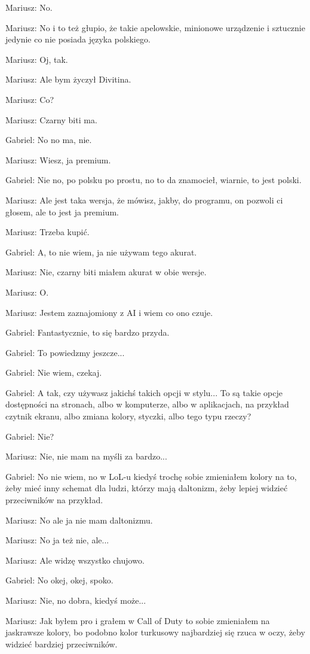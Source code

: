 Mariusz: No.

Mariusz: No i to też głupio, że takie apelowskie, minionowe urządzenie i sztucznie jedynie co nie posiada języka polskiego.

Mariusz: Oj, tak.

Mariusz: Ale bym życzył Divitina.

Mariusz: Co?

Mariusz: Czarny biti ma.

Gabriel: No no ma, nie.

Mariusz: Wiesz, ja premium.

Gabriel: Nie no, po polsku po prostu, no to da znamocieł, wiarnie, to jest polski.

Mariusz: Ale jest taka wersja, że mówisz, jakby, do programu, on pozwoli ci głosem, ale to jest ja premium.

Mariusz: Trzeba kupić.

Gabriel: A, to nie wiem, ja nie używam tego akurat.

Mariusz: Nie, czarny biti miałem akurat w obie wersje.

Mariusz: O.

Mariusz: Jestem zaznajomiony z AI i wiem co ono czuje.

Gabriel: Fantastycznie, to się bardzo przyda.

Gabriel: To powiedzmy jeszcze...

Gabriel: Nie wiem, czekaj.

Gabriel: A tak, czy używasz jakichś takich opcji w stylu... To są takie opcje dostępności na stronach, albo w komputerze, albo w aplikacjach, na przykład czytnik ekranu, albo zmiana kolory, styczki, albo tego typu rzeczy?

Gabriel: Nie?

Mariusz: Nie, nie mam na myśli za bardzo...

Gabriel: No nie wiem, no w LoL-u kiedyś trochę sobie zmieniałem kolory na to, żeby mieć inny schemat dla ludzi, którzy mają daltonizm, żeby lepiej widzieć przeciwników na przykład.

Mariusz: No ale ja nie mam daltonizmu.

Mariusz: No ja też nie, ale...

Mariusz: Ale widzę wszystko chujowo.

Gabriel: No okej, okej, spoko.

Mariusz: Nie, no dobra, kiedyś może...

Mariusz: Jak byłem pro i grałem w Call of Duty to sobie zmieniałem na jaskrawsze kolory, bo podobno kolor turkusowy najbardziej się rzuca w oczy, żeby widzieć bardziej przeciwników.

